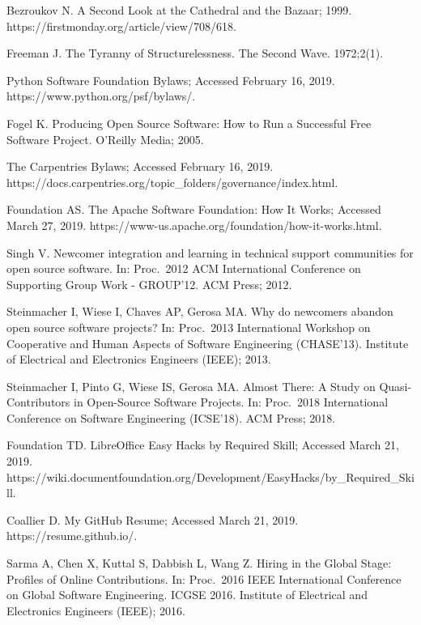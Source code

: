 \documentclass[10pt,letterpaper]{article}
\begin{document}
\begin{thebibliography}{10}
Bezroukov N. A Second Look at the Cathedral and the Bazaar; 1999.
\newblock https://firstmonday.org/article/view/708/618.

Freeman J.
\newblock The Tyranny of Structurelessness.
\newblock The Second Wave. 1972;2(1).

Python Software Foundation Bylaws; Accessed February 16, 2019.
\newblock https://www.python.org/psf/bylaws/.

Fogel K.
\newblock Producing Open Source Software: How to Run a Successful Free Software
  Project.
\newblock O'Reilly Media; 2005.

The Carpentries Bylaws; Accessed February 16, 2019.
\newblock https://docs.carpentries.org/topic\_folders/governance/index.html.

Foundation AS. The Apache Software Foundation: How It Works; Accessed March 27,
  2019.
\newblock https://www-us.apache.org/foundation/how-it-works.html.

Singh V.
\newblock Newcomer integration and learning in technical support communities
  for open source software.
\newblock In: Proc.\ 2012 {ACM} International Conference on Supporting Group
  Work - {GROUP'12}. {ACM} Press; 2012.

Steinmacher I, Wiese I, Chaves AP, Gerosa MA.
\newblock Why do newcomers abandon open source software projects?
\newblock In: Proc.\ 2013 International Workshop on Cooperative and Human
  Aspects of Software Engineering ({CHASE'13}). Institute of Electrical and
  Electronics Engineers ({IEEE}); 2013.

Steinmacher I, Pinto G, Wiese IS, Gerosa MA.
\newblock Almost There: A Study on Quasi-Contributors in Open-Source Software
  Projects.
\newblock In: Proc.\ 2018 International Conference on Software Engineering
  ({ICSE'18}). {ACM} Press; 2018.

Foundation TD. LibreOffice Easy Hacks by Required Skill; Accessed March 21,
  2019.
\newblock
  https://wiki.documentfoundation.org/Development/EasyHacks/by\_Required\_Skill.

Coallier D. My GitHub Resume; Accessed March 21, 2019.
\newblock https://resume.github.io/.

Sarma A, Chen X, Kuttal S, Dabbish L, Wang Z.
\newblock Hiring in the Global Stage: Profiles of Online Contributions.
\newblock In: Proc.\ 2016 {IEEE} International Conference on Global Software
  Engineering. ICGSE 2016. Institute of Electrical and Electronics Engineers
  ({IEEE}); 2016.


\end{thebibliography}
\end{document}
